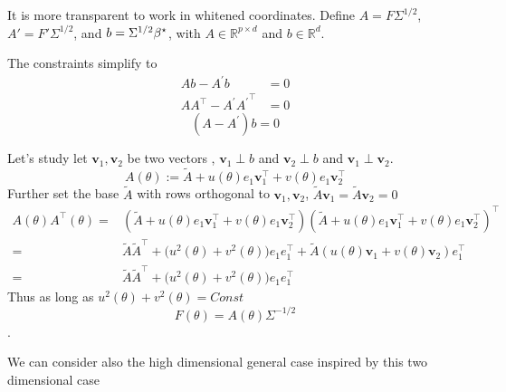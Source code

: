 It is more transparent to work in whitened coordinates. Define
$A=F\Sigma^{1/2}$, $A'=F'\Sigma^{1/2}$, and
$b=\Sigma^{1/2}{\beta^{\star}}$, with $A\in\mathbb R^{p\times d}$ and
$b\in\mathbb R^d$.

The constraints simplify to
\begin{align*}
Ab-A^{\prime}b & =0\\
AA^{\top}-A^{\prime}{A^\prime}^{\top} & =0
\end{align*}
\[
(A-A^{\prime})b=0
\]

\begin{example}
Let's study let $\mathbf{v}_{1},\mathbf{v}_{2}$ be two vectors ,
$\mathbf{v}_{1}\perp b$ and $\mathbf{v}_{2}\perp b$ and $\mathbf{v}_{1}\perp\mathbf{v}_{2}$.
\[
A(\theta):=\tilde{A}+u(\theta)e_{1}\mathbf{v}_{1}^{\top}+v(\theta)e_{1}\mathbf{v}_{2}^{\top}
\]
Further set the base $\tilde{A}$ with rows orthogonal to $\mathbf{v}_{1},\mathbf{v}_{2}$,
$\tilde{A}\mathbf{v}_{1}=\tilde{A}\mathbf{v}_{2}=0$
\begin{align*}
A(\theta)A^{\top}(\theta)= & (\tilde{A}+u(\theta)e_{1}\mathbf{v}_{1}^{\top}+v(\theta)e_{1}\mathbf{v}_{2}^{\top})(\tilde{A}+u(\theta)e_{1}\mathbf{v}_{1}^{\top}+v(\theta)e_{1}\mathbf{v}_{2}^{\top})^{\top}\\
= & \tilde{A}\tilde{A}^{\top}+\big(u^{2}(\theta)+v^{2}(\theta)\big)e_{1}e_{1}^{\top}+\tilde{A}(u(\theta)\mathbf{v}_{1}+v(\theta)\mathbf{v}_{2})e_{1}^{\top}\\
= & \tilde{A}\tilde{A}^{\top}+\big(u^{2}(\theta)+v^{2}(\theta)\big)e_{1}e_{1}^{\top}
\end{align*}
Thus as long as $u^{2}(\theta)+v^{2}(\theta)=Const$
\[
F(\theta)=A(\theta)\Sigma^{-1/2}
\]
.
\end{example}
We can consider also the high dimensional general case inspired by
this two dimensional case
